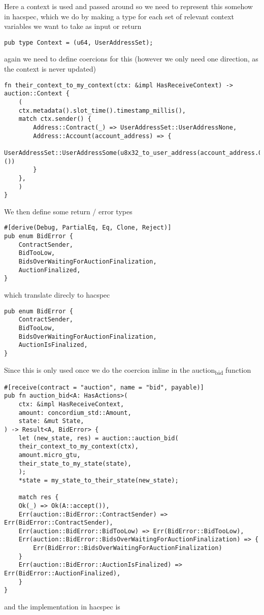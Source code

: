 \documentclass[11pt]{article}
\begin{document}
Here a context is used and passed around so we need to represent this somehow in hacspec, which we do by making a
 type for each set of relevant context variables we want to take as input or return
\begin{verbatim}
pub type Context = (u64, UserAddressSet);
\end{verbatim}
again we need to define coercions for this (however we only need one direction, as the context is never updated)
\begin{verbatim}
fn their_context_to_my_context(ctx: &impl HasReceiveContext) -> auction::Context {
    (
	ctx.metadata().slot_time().timestamp_millis(),
	match ctx.sender() {
	    Address::Contract(_) => UserAddressSet::UserAddressNone,
	    Address::Account(account_address) => {
		UserAddressSet::UserAddressSome(u8x32_to_user_address(account_address.0), ())
	    }
	},
    )
}
\end{verbatim}
We then define some return / error types
\begin{verbatim}
#[derive(Debug, PartialEq, Eq, Clone, Reject)]
pub enum BidError {
    ContractSender,
    BidTooLow,
    BidsOverWaitingForAuctionFinalization,
    AuctionFinalized,
}
\end{verbatim}
which translate direcly to hacspec
\begin{verbatim}
pub enum BidError {
    ContractSender,
    BidTooLow,
    BidsOverWaitingForAuctionFinalization,
    AuctionIsFinalized,
}
\end{verbatim}
Since this is only used once we do the coercion inline in the auction\textsubscript{bid} function
\begin{verbatim}
#[receive(contract = "auction", name = "bid", payable)]
pub fn auction_bid<A: HasActions>(
    ctx: &impl HasReceiveContext,
    amount: concordium_std::Amount,
    state: &mut State,
) -> Result<A, BidError> {
    let (new_state, res) = auction::auction_bid(
	their_context_to_my_context(ctx),
	amount.micro_gtu,
	their_state_to_my_state(state),
    );
    *state = my_state_to_their_state(new_state);

    match res {
	Ok(_) => Ok(A::accept()),
	Err(auction::BidError::ContractSender) => Err(BidError::ContractSender),
	Err(auction::BidError::BidTooLow) => Err(BidError::BidTooLow),
	Err(auction::BidError::BidsOverWaitingForAuctionFinalization) => {
	    Err(BidError::BidsOverWaitingForAuctionFinalization)
	}
	Err(auction::BidError::AuctionIsFinalized) => Err(BidError::AuctionFinalized),
    }
}
\end{verbatim}
and the implementation in hacspec is
\end{document}
